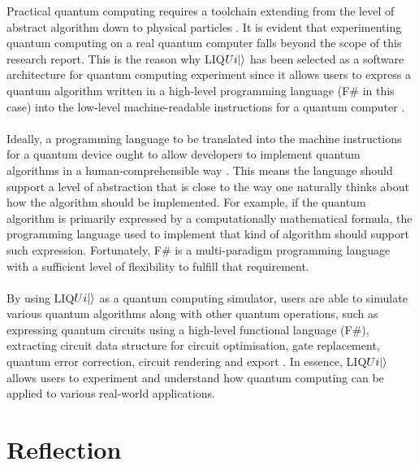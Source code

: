 \documentclass[12pt]{third-rep}
\begin{document}
\noindent Practical quantum computing requires a toolchain extending from the level of abstract algorithm down to physical particles \cite{acm}. It is evident that experimenting quantum computing on a real quantum computer falls beyond the scope of this research report. This is the reason why LIQ$Ui{\left\vert{}\right\rangle}$ has been selected as a software architecture for quantum computing experiment since it allows users to express a quantum algorithm written in a high-level programming language (F\# in this case) into the low-level machine-readable instructions for a quantum computer \cite{liquid-overview}. \\\\
Ideally, a programming language to be translated into the machine instructions for a quantum device ought to allow developers to implement quantum algorithms in a human-comprehensible way \cite{acm}. This means the language should support a level of abstraction that is close to the way one naturally thinks about how the algorithm should be implemented. For example, if the quantum algorithm is primarily expressed by a computationally mathematical formula, the programming language used to implement that kind of algorithm should support such expression. Fortunately, F\# is a multi-paradigm programming language with a sufficient level of flexibility to fulfill that requirement. \\\\
By using LIQ$Ui{\left\vert{}\right\rangle}$ as a quantum computing simulator, users are able to simulate various quantum algorithms along with other quantum operations, such as expressing quantum circuits using a high-level functional language (F\#), extracting circuit data structure for circuit optimisation, gate replacement, quantum error correction, circuit rendering and export \cite{liquid-overview}. In essence, LIQ$Ui{\left\vert{}\right\rangle}$ allows users to experiment and understand how quantum computing can be applied to various real-world applications.


\chapter{Reflection}
\end{document}
